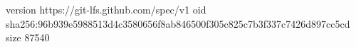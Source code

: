 version https://git-lfs.github.com/spec/v1
oid sha256:96b939e5988513d4c3580656f8ab846500f305c825c7b3f337c7426d897cc5cd
size 87540
